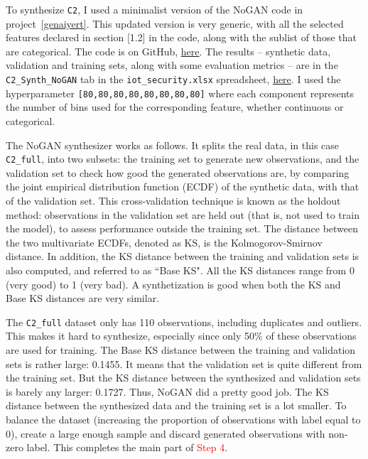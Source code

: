 \documentclass[oneside,10pt]{book}
\begin{document}
To synthesize \texttt{C2}, I used a minimalist version of the NoGAN code in project~\ref{genaiyert}. This updated version is very generic,
 with all the selected features declared in section [1.2] in the code, along with the sublist of those that are categorical.
  The code is on GitHub, \href{https://github.com/VincentGranville/Main/blob/main/NoGAN_iot.py}{here}.
 The results -- synthetic data, validation and training sets, along with some evaluation metrics -- are
 in the \texttt{C2\_Synth\_NoGAN} tab
 in the \texttt{iot\_security.xlsx} spreadsheet,
 \href{https://github.com/VincentGranville/Main/blob/main/iot_security.xlsx}{here}.
I used the \textcolor{index}{hyperparameter}
\texttt{[80,80,80,80,80,80,80,80]} where each component represents the number of bins used for the corresponding feature,
 whether continuous or categorical.

The NoGAN synthesizer works as follows. It splits the real data, in this case
\texttt{C2\_full}, into two subsets: the \textcolor{index}{training set} to generate
 new observations, and the \textcolor{index}{validation set} to check how good the generated observations are, by comparing the \textcolor{index}{joint empirical distribution function} (ECDF) of the synthetic data, with that of the validation set. This
 \textcolor{index}{cross-validation} technique is known as the
\textcolor{index}{holdout method}: observations in the validation set are held out (that is, not used to train the model),
 to assess performance outside the training set. The distance between the two multivariate ECDFs, denoted as KS,
 is the \textcolor{index}{Kolmogorov-Smirnov distance}. In addition, the KS distance between
 the training and validation sets is also computed, and referred to as ``Base KS". All the KS distances range from 0 (very good) to 1 (very bad).
 A synthetization is good when both the KS and Base KS distances are very similar.

The \texttt{C2\_full} dataset only has 110 observations, including duplicates and outliers. This makes it hard to synthesize, especially since only 50\% of these observations are used for training. The Base KS distance between the training and validation sets is rather large: 0.1455. It means that the validation set is quite different from the training set. But the KS distance between the synthesized and validation sets is barely any larger: 0.1727. Thus, NoGAN did a pretty good job. The KS distance between the synthesized data and the training set is a lot smaller. To balance the dataset (increasing the proportion of observations with label equal to 0), create a large enough sample and discard generated observations with non-zero label. This completes the main part of
 \textcolor{red}{Step 4}.
\end{document}

